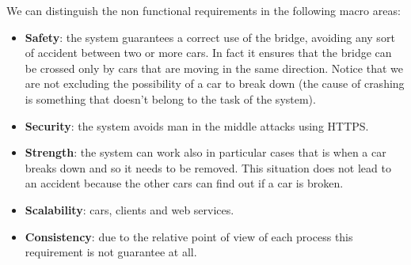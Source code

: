 We can distinguish the non functional requirements in the following macro areas:
\begin{itemize}
    \item \textbf{Safety}: the system guarantees a correct use of the bridge, avoiding 
        any sort of accident between two or more cars. 
        In fact it ensures that the bridge can be crossed only by cars that are moving 
        in the same direction. 
        Notice that we are not excluding the possibility of a car to break down 
        (the cause of crashing is something that doesn’t belong to the task of the system).
    \item \textbf{Security}: the system avoids man in the middle attacks using HTTPS.
    \item \textbf{Strength}: the system can work also in particular cases that is when a 
        car breaks down and so it needs to be removed. 
        This situation does not lead to an accident because the other cars can find out 
        if a car is broken.
    \item \textbf{Scalability}: cars, clients and web services.
    \item \textbf{Consistency}: due to the relative point of view of each process this 
    requirement is not guarantee at all.
\end{itemize}
